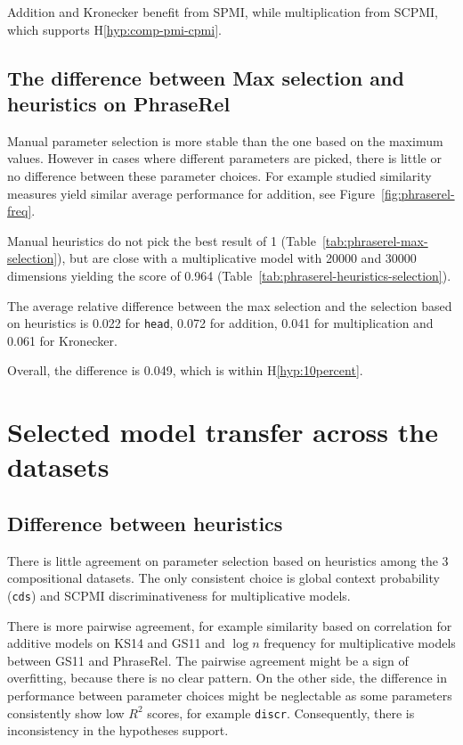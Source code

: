Addition and Kronecker benefit from SPMI, while multiplication from SCPMI, which supports H\ref{hyp:comp-pmi-cpmi}.

\subsection{The difference between Max selection and heuristics on PhraseRel}
\label{sec:diff-phraserel}

Manual parameter selection is more stable than the one based on the maximum values. However in cases where different parameters are picked, there is little or no difference between these parameter choices. For example studied similarity measures yield similar average performance for addition, see Figure~\ref{fig:phraserel-freq}.

Manual heuristics do not pick the best result of 1 (Table~\ref{tab:phraserel-max-selection}), but are close with a multiplicative model with 20000 and 30000 dimensions yielding the score of 0.964 (Table~\ref{tab:phraserel-heuristics-selection}).

The average relative difference between the max selection and the selection based on heuristics is 0.022 for \texttt{head}, 0.072 for addition, 0.041 for multiplication and 0.061 for Kronecker.

Overall, the difference is 0.049, which is within H\ref{hyp:10percent}.

\section{Selected model transfer across the datasets}
\label{sec:select-model-transf-comp}

\subsection{Difference between heuristics}
\label{sec:diff-betw-heur-comp}

There is little agreement on parameter selection based on heuristics among the 3 compositional datasets. The only consistent choice is global context probability (\texttt{cds}) and SCPMI discriminativeness for multiplicative models.

There is more pairwise agreement, for example similarity based on correlation for additive models on KS14 and GS11 and $\log n$ frequency for multiplicative models between GS11 and PhraseRel. The pairwise agreement might be a sign of overfitting, because there is no clear pattern. On the other side, the difference in performance between parameter choices might be neglectable as some parameters consistently show low $R^2$ scores, for example \texttt{discr}. Consequently, there is inconsistency in the hypotheses support.


